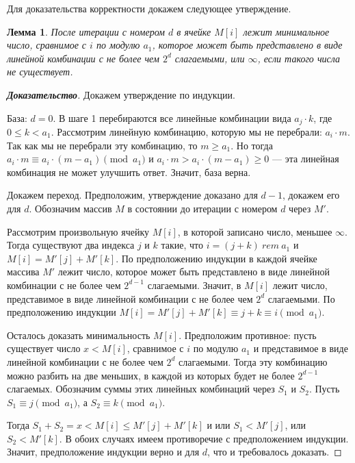\documentclass[12pt]{article}
\newtheorem{lemma}[theorem]{Лемма}
\begin{document}
Для доказательства корректности докажем следующее утверждение.

\begin{lemma}
\label{algorithm:lemma2}
После итерации с номером $d$ в ячейке $M[i]$ лежит минимальное число, сравнимое с $i$ по модулю $a_1$, которое может быть представлено в виде линейной комбинации с не более чем $2^d$ слагаемыми, или $\infty$, если такого числа не существует.
\end{lemma}
\begin{proof}[\textbf{Доказательство}]
Докажем утверждение по индукции.

База: $d = 0$. В шаге 1 перебираются все линейные комбинации вида $a_j \cdot k$, где $0 \le k < a_1$. Рассмотрим линейную комбинацию, которую мы не перебрали: $a_i \cdot m$. Так как мы не перебрали эту комбинацию, то $m \ge a_1$. Но тогда $a_i \cdot m \equiv a_i \cdot (m - a_1) \pmod {a_1}$ и $a_i \cdot m > a_i \cdot (m - a_1) \ge 0$ --- эта линейная комбинация не может улучшить ответ. Значит, база верна.

Докажем переход. Предположим, утверждение доказано для $d - 1$, докажем его для $d$. Обозначим массив $M$ в состоянии до итерации с номером $d$ через $M'$.

Рассмотрим произвольную ячейку $M[i]$, в которой записано число, меньшее $\infty$. Тогда существуют два индекса $j$ и $k$ такие, что $i = (j + k) \ rem \ a_1$ и $M[i] = M'[j] + M'[k]$. По предположению индукции в каждой ячейке массива $M'$ лежит число, которое может быть представлено в виде линейной комбинации с не более чем $2^{d - 1}$ слагаемыми. Значит, в $M[i]$ лежит число, представимое в виде линейной комбинации с не более чем $2^d$ слагаемыми. По предположению индукции $M[i] = M'[j] + M'[k] \equiv j + k \equiv i \pmod{a_1}$.

Осталось доказать минимальность $M[i]$. Предположим противное: пусть существует число $x < M[i]$, сравнимое с $i$ по модулю $a_1$ и представимое в виде линейной комбинации с не более чем $2^d$ слагаемыми. Тогда эту комбинацию можно разбить на две меньших, в каждой из которых будет не более $2^{d - 1}$ слагаемых. Обозначим суммы этих линейных комбинаций через $S_1$ и $S_2$. Пусть $S_1 \equiv j \pmod{a_1}$, а $S_2 \equiv k \pmod{a_1}$.

Тогда $S_1 + S_2 = x < M[i] \le M'[j] + M'[k]$ и или $S_1 < M'[j]$, или $S_2 < M'[k]$. В обоих случаях имеем противоречие с предположением индукции. Значит, предположение индукции верно и для $d$, что и требовалось доказать.
\end{proof}
\end{document}
